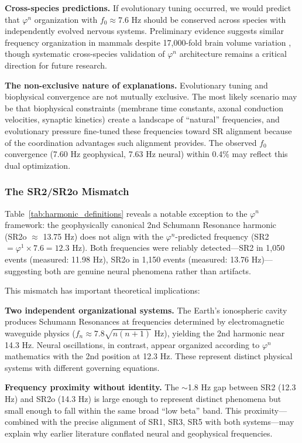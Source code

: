 \documentclass[11pt,a4paper]{article}
\newcommand{\phisym}{\varphi}
\begin{document}
\textbf{Cross-species predictions.} If evolutionary tuning occurred, we would predict that $\phisym^n$ organization with $f_0 \approx 7.6$ Hz should be conserved across species with independently evolved nervous systems. Preliminary evidence suggests similar frequency organization in mammals despite 17,000-fold brain volume variation \parencite{buzsaki2013scaling}, though systematic cross-species validation of $\phisym^n$ architecture remains a critical direction for future research.

\textbf{The non-exclusive nature of explanations.} Evolutionary tuning and biophysical convergence are not mutually exclusive. The most likely scenario may be that biophysical constraints (membrane time constants, axonal conduction velocities, synaptic kinetics) create a landscape of ``natural'' frequencies, and evolutionary pressure fine-tuned these frequencies toward SR alignment because of the coordination advantages such alignment provides. The observed $f_0$ convergence (7.60 Hz geophysical, 7.63 Hz neural) within 0.4\% may reflect this dual optimization.

\subsubsection{The SR2/SR2o Mismatch}

Table~\ref{tab:harmonic_definitions} reveals a notable exception to the $\phisym^n$ framework: the geophysically canonical 2nd Schumann Resonance harmonic (SR2o $\approx$ 13.75 Hz) does not align with the $\phisym^n$-predicted frequency (SR2 $= \phisym^1 \times 7.6 = 12.3$ Hz). Both frequencies were reliably detected---SR2 in 1,050 events (measured: 11.98 Hz), SR2o in 1,150 events (measured: 13.76 Hz)---suggesting both are genuine neural phenomena rather than artifacts.

This mismatch has important theoretical implications:

\textbf{Two independent organizational systems.} The Earth's ionospheric cavity produces Schumann Resonances at frequencies determined by electromagnetic waveguide physics ($f_n \approx 7.8\sqrt{n(n+1)}$ Hz), yielding the 2nd harmonic near 14.3 Hz. Neural oscillations, in contrast, appear organized according to $\phisym^n$ mathematics with the 2nd position at 12.3 Hz. These represent distinct physical systems with different governing equations.

\textbf{Frequency proximity without identity.} The $\sim$1.8 Hz gap between SR2 (12.3 Hz) and SR2o (14.3 Hz) is large enough to represent distinct phenomena but small enough to fall within the same broad ``low beta'' band. This proximity---combined with the precise alignment of SR1, SR3, SR5 with both systems---may explain why earlier literature conflated neural and geophysical frequencies.
\end{document}
